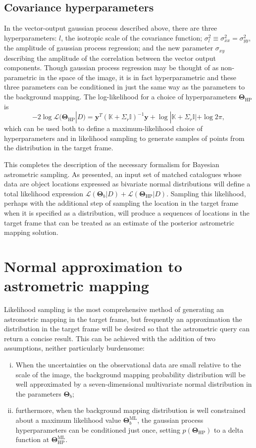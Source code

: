 \documentclass[manuscript]{aastex}
\newcommand{\bsT}{\boldsymbol\Theta}
\begin{document}
\subsection{Covariance hyperparameters}
In the vector-output gaussian process described above, there are three hyperparameters: $l$, the isotropic scale of the covariance function; $\sigma^2_{l}\equiv \sigma^2_{xx}=\sigma^2_{yy}$, the amplitude of gaussian process regression; and the new parameter $\sigma_{xy}$ describing the amplitude of the correlation between the vector output components. Though gaussian process regression may be thought of as non-parametric in the space of the image, it is in fact hyperparametric and these three parameters can be conditioned in just the same way as the parameters to the background mapping. The log-likelihood for a choice of hyperparameters $\bsT_\mathrm{HP}$ is
\begin{equation}
-2\log\mathcal{L}(\bsT_\mathrm{HP}|D) = \mathbf{y}^T(\mathbb{K}+\Sigma_r\mathbb{I})^{-1} \mathbf{y} + \log|\mathbb{K}+\Sigma_r\mathbb{I}| + \log2\pi,
\end{equation}
which can be used both to define a maximum-likelihood choice of hyperparameters and in likelihood sampling to generate samples of points from the distribution in the target frame.

This completes the description of the necessary formalism for Bayesian astrometric sampling. As presented, an input set of matched catalogues whose data are object locations expressed as bivariate normal distributions will define a total likelihood expression $\mathcal{L}(\bsT_b|D) + \mathcal{L}(\bsT_\mathrm{HP}|D)$. Sampling this likelihood, perhaps with the additional step of sampling the location in the target frame when it is specified as a distribution, will produce a sequences of locations in the target frame that can be treated as an estimate of the posterior astrometric mapping solution.

\section{Normal approximation to astrometric mapping}\label{sec:normapprox}
Likelihood sampling is the most comprehensive method of generating an astrometric mapping in the target frame, but frequently an approximation the distribution in the target frame will be desired so that the astrometric query can return a concise result. This can be achieved with the addition of two assumptions, neither particularly burdensome:
\begin{enumerate}[(i)]
\item When the uncertainties on the observational data are small relative to the scale of the image, the background mapping probability distribution will be well approximated by a seven-dimensional multivariate normal distribution in the parameters $\bsT_b$;
\item furthermore, when the background mapping distribution is well constrained about a maximum likelihood value $\bsT_b^\mathrm{ML}$, the gaussian process hyperparameters can be conditioned just once, setting $p(\bsT_\mathrm{HP})$ to a delta function at $\bsT_\mathrm{HP}^\mathrm{ML}$.
\end{enumerate}
\end{document}
